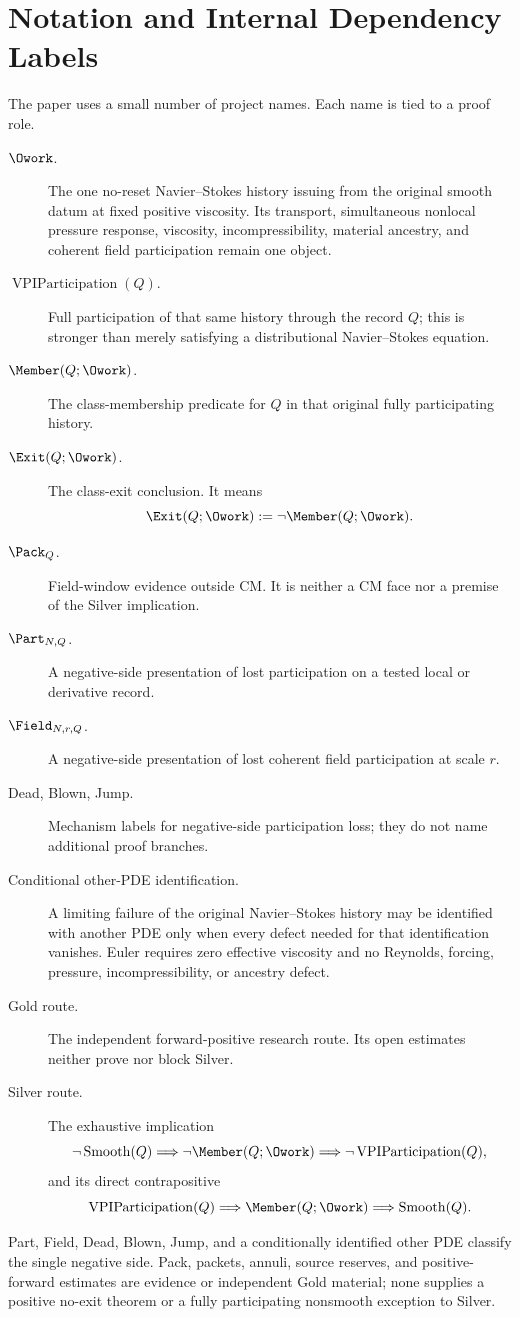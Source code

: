 \section{Notation and Internal Dependency Labels}

The paper uses a small number of project names.  Each name is tied to a proof role.

\begin{description}
\item[\(\Owork\).] The one no-reset Navier--Stokes history issuing from the original smooth datum at fixed positive viscosity.  Its transport, simultaneous nonlocal pressure response, viscosity, incompressibility, material ancestry, and coherent field participation remain one object.
\item[\(\operatorname{VPIParticipation}(Q)\).] Full participation of that same history through the record \(Q\); this is stronger than merely satisfying a distributional Navier--Stokes equation.
\item[\(\Member(Q;\Owork)\).] The class-membership predicate for \(Q\) in that original fully participating history.
\item[\(\Exit(Q;\Owork)\).] The class-exit conclusion.  It means
\[
  \Exit(Q;\Owork):=\neg\Member(Q;\Owork).
\]
\item[\(\Pack_Q\).] Field-window evidence outside CM.  It is neither a CM face nor a premise of the Silver implication.
\item[\(\Part_{N,Q}\).] A negative-side presentation of lost participation on a tested local or derivative record.
\item[\(\Field_{N,r,Q}\).] A negative-side presentation of lost coherent field participation at scale \(r\).
\item[Dead, Blown, Jump.] Mechanism labels for negative-side participation loss; they do not name additional proof branches.
\item[Conditional other-PDE identification.] A limiting failure of the original Navier--Stokes history may be identified with another PDE only when every defect needed for that identification vanishes.  Euler requires zero effective viscosity and no Reynolds, forcing, pressure, incompressibility, or ancestry defect.
\item[Gold route.] The independent forward-positive research route.  Its open estimates neither prove nor block Silver.
\item[Silver route.] The exhaustive implication
\[
  \neg\operatorname{Smooth}(Q)
  \Longrightarrow \neg\Member(Q;\Owork)
  \Longrightarrow \neg\operatorname{VPIParticipation}(Q),
\]
and its direct contrapositive
\[
  \operatorname{VPIParticipation}(Q)
  \Longrightarrow \Member(Q;\Owork)
  \Longrightarrow \operatorname{Smooth}(Q).
\]
\end{description}

Part, Field, Dead, Blown, Jump, and a conditionally identified other PDE classify the single negative side.  Pack, packets, annuli, source reserves, and positive-forward estimates are evidence or independent Gold material; none supplies a positive no-exit theorem or a fully participating nonsmooth exception to Silver.
